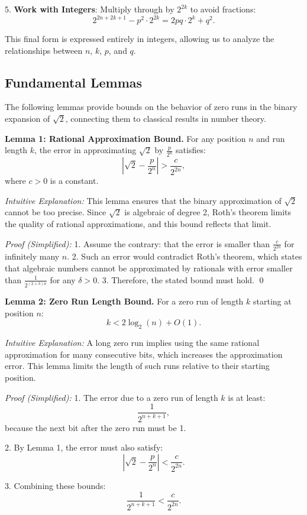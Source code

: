 5. \textbf{Work with Integers}: Multiply through by $2^{2k}$ to avoid fractions:
\[
2^{2n+2k+1} - p^2 \cdot 2^{2k} = 2pq \cdot 2^k + q^2.
\]

This final form is expressed entirely in integers, allowing us to analyze the relationships between $n$, $k$, $p$, and $q$.

\subsection{Fundamental Lemmas}
The following lemmas provide bounds on the behavior of zero runs in the binary expansion of $\sqrt{2}$, connecting them to classical results in number theory.

\textbf{Lemma 1: Rational Approximation Bound.}  
For any position $n$ and run length $k$, the error in approximating $\sqrt{2}$ by $\frac{p}{2^n}$ satisfies:
\[
\left|\sqrt{2} - \frac{p}{2^n}\right| > \frac{c}{2^{2n}},
\]
where $c > 0$ is a constant.

\textit{Intuitive Explanation:}  
This lemma ensures that the binary approximation of $\sqrt{2}$ cannot be too precise. Since $\sqrt{2}$ is algebraic of degree 2, Roth's theorem limits the quality of rational approximations, and this bound reflects that limit.

\textit{Proof (Simplified):}  
1. Assume the contrary: that the error is smaller than $\frac{c}{2^{2n}}$ for infinitely many $n$.
2. Such an error would contradict Roth's theorem, which states that algebraic numbers cannot be approximated by rationals with error smaller than $\frac{1}{2^{(2+\delta)n}}$ for any $\delta > 0$. 
3. Therefore, the stated bound must hold. \qed

\textbf{Lemma 2: Zero Run Length Bound.}  
For a zero run of length $k$ starting at position $n$:
\[
k < 2 \log_2(n) + O(1).
\]

\textit{Intuitive Explanation:}  
A long zero run implies using the same rational approximation for many consecutive bits, which increases the approximation error. This lemma limits the length of such runs relative to their starting position.

\textit{Proof (Simplified):}  
1. The error due to a zero run of length $k$ is at least:
\[
\frac{1}{2^{n+k+1}},
\]
because the next bit after the zero run must be 1.

2. By Lemma 1, the error must also satisfy:
\[
\left|\sqrt{2} - \frac{p}{2^n}\right| < \frac{c}{2^{2n}}.
\]

3. Combining these bounds:
\[
\frac{1}{2^{n+k+1}} < \frac{c}{2^{2n}}.
\]

